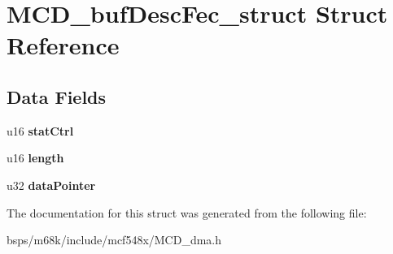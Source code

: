 \hypertarget{structMCD__bufDescFec__struct}{}\section{M\+C\+D\+\_\+buf\+Desc\+Fec\+\_\+struct Struct Reference}
\label{structMCD__bufDescFec__struct}
\subsection*{Data Fields}
\begin{DoxyCompactItemize}
\item 
\mbox{\label{structMCD__bufDescFec__struct_abe46dcff0bc935b0e6e84f4e08c22fd8}} 
u16 {\bfseries stat\+Ctrl}
\item 
\mbox{\label{structMCD__bufDescFec__struct_a6afa00ac7282f9b513d6741bbd021982}} 
u16 {\bfseries length}
\item 
\mbox{\label{structMCD__bufDescFec__struct_a52550395b40f9ea4108bc4c0f93cada5}} 
u32 {\bfseries data\+Pointer}
\end{DoxyCompactItemize}


The documentation for this struct was generated from the following file\+:\begin{DoxyCompactItemize}
\item 
bsps/m68k/include/mcf548x/M\+C\+D\+\_\+dma.\+h\end{DoxyCompactItemize}
